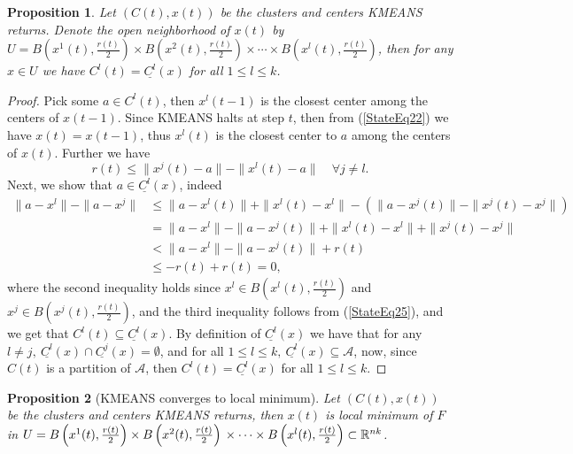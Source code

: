 \documentclass[11pt]{article}
\numberwithin{equation}{section}
\newtheorem{proposition}{Proposition}[section]
\begin{document}
\begin{proposition} \label{StateEq24}
Let $(C(t), x(t))$ be the clusters and centers KMEANS returns. Denote the open neighborhood of $x(t)$ by $U = B\left( x^1(t),\frac{r(t)}{2}\right) \times  B\left( x^2(t),\frac{r(t)}{2}\right) \times \cdots \times B\left( x^l(t),\frac{r(t)}{2} \right)$, then for any $x \in U$ we have $C^l(t) = \underline{C^l}(x)$ for all $1 \leq l \leq k$.
\end{proposition}

\begin{proof}
Pick some $a \in C^l(t)$, then $x^l(t-1)$ is the closest center among the centers of $x(t-1)$. Since KMEANS halts at step $t$, then from (\ref{StateEq22}) we have $x(t)=x(t-1)$, thus $x^l(t)$ is the closest center to $a$ among the centers of $x(t)$. Further we have
\begin{equation}
	r(t) \leq \|x^j(t) - a\| - \|x^l(t) -a\| \quad \forall j \neq l . \label{StateEq25}
\end{equation}
Next, we show that $a \in \underline{C^l}(x)$, indeed
\begin{equation*}
\begin{aligned}
	\|a - x^l\| -  \|a - x^j\| &\leq \|a - x^l(t)\| + \|x^l(t) - x^l\| - \left( \|a - x^j(t)\| - \|x^j(t) - x^j\| \right) \\
	& = \|a - x^l\| - \|a - x^j(t)\| + \|x^l(t) - x^l\| + \|x^j(t) - x^j\| \\
	& < \|a - x^l\| - \|a - x^j(t)\| + r(t) \\
	& \leq -r(t) + r(t) = 0 ,
\end{aligned}
\end{equation*}
where the second inequality holds since $x^l \in B\left( x^l(t), \frac{r(t)}{2} \right)$ and $x^j \in B\left( x^j(t), \frac{r(t)}{2} \right)$, and the third inequality follows from (\ref{StateEq25}), and we get that $C^l(t) \subseteq \underline{C^l}(x)$. 
By definition of $\underline{C^l}(x)$ we have that for any $l \neq j, \: \underline{C^l}(x) \cap \underline{C^j}(x)=\emptyset$, and for all $1 \leq l \leq k, \: \underline{C^l}(x) \subseteq \mathcal{A}$, now, since $C(t)$ is a partition of $\mathcal{A}$, then $C^l(t) = \underline{C^l}(x)$ for all $1 \leq l \leq k$.
\end{proof}

\begin{proposition}[KMEANS converges to local minimum]
Let $(C(t), x(t))$ be the clusters and centers KMEANS returns, then $x(t)$ is local minimum of $F$ in $U = B\left( x^1(t),\frac{r(t)}{2}\right) \times  B\left( x^2(t),\frac{r(t)}{2}\right) \\ \times \cdots \times B\left( x^l(t),\frac{r(t)}{2} \right) \subset \mathbb{R}^{nk}$.
\end{proposition}
\end{document}
